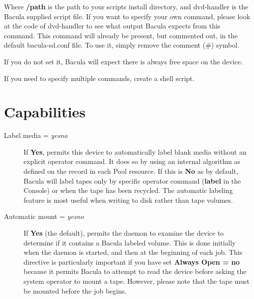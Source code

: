 \begin{description}
  Where {\bf /path} is the path to your scripts install directory, and
  dvd-handler is the Bacula supplied script file.
  If you want to specify your own command, please look at the code of
  dvd-handler to see what output Bacula expects from this command.
  This command will already be present, but commented out,
  in the default bacula-sd.conf file. To use it, simply remove
  the comment (\#) symbol.

  If you do not set it, Bacula will expect there is always free space on the
  device. 

  If you need to specify multiple commands, create a shell script.

\end{description}

\label{AutochangerRes}
\label{AutochangerResource1}





\section{Capabilities}

\begin{description}

\item [Label media = {\it yes\vb{}no}]
   If {\bf Yes}, permits this device to automatically label blank media
   without an explicit operator command.  It does so by using an internal
   algorithm as defined on the  record in each
   Pool resource.  If this is {\bf No} as by default, Bacula will label
   tapes only by specific operator command ({\bf label} in the Console) or
   when the tape has been recycled.  The automatic labeling feature is most
   useful when writing to disk rather than tape volumes.

\item [Automatic mount = {\it yes\vb{}no}]
   If {\bf Yes} (the default), permits the daemon to examine the device to
   determine if it contains a Bacula labeled volume.  This is done
   initially when the daemon is started, and then at the beginning of each
   job.  This directive is particularly important if you have set
   {\bf Always Open = no} because it permits Bacula to attempt to read the
   device before asking the system operator to mount a tape.  However,
   please note that the tape must be mounted before the job begins.

\end{description}

